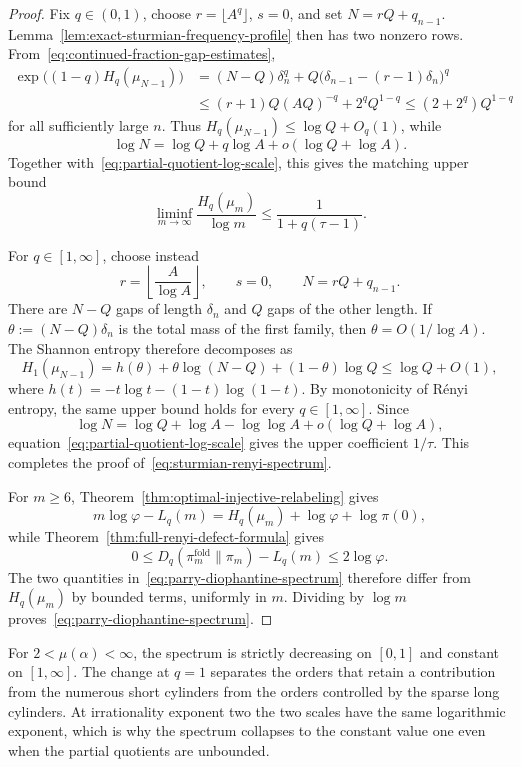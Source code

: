 \begin{proof}
Fix \(q\in(0,1)\), choose \(r=\lfloor A^q\rfloor\), \(s=0\), and set
\(N=rQ+q_{n-1}\). Lemma~\ref{lem:exact-sturmian-frequency-profile} then
has two nonzero rows. From~\eqref{eq:continued-fraction-gap-estimates},
\[
\begin{aligned}
\exp\bigl((1-q)H_q(\mu_{N-1})\bigr)
&=(N-Q)\delta_n^q
+Q\bigl(\delta_{n-1}-(r-1)\delta_n\bigr)^q\\
&\le (r+1)Q(AQ)^{-q}+2^q Q^{1-q}
\le (2+2^q)Q^{1-q}
\end{aligned}
\]
for all sufficiently large \(n\). Thus
\(H_q(\mu_{N-1})\le\log Q+O_q(1)\), while
\[
\log N=\log Q+q\log A+o(\log Q+\log A).
\]
Together with~\eqref{eq:partial-quotient-log-scale}, this gives the matching
upper bound
\[
\liminf_{m\to\infty}\frac{H_q(\mu_m)}{\log m}
\le\frac{1}{1+q(\tau-1)}.
\]

For \(q\in[1,\infty]\), choose instead
\[
r=\left\lfloor\frac{A}{\log A}\right\rfloor,\qquad
s=0,\qquad
N=rQ+q_{n-1}.
\]
There are \(N-Q\) gaps of length \(\delta_n\) and \(Q\) gaps of the other
length. If
\(\theta:=(N-Q)\delta_n\) is the total mass of the first family, then
\(\theta=O(1/\log A)\). The Shannon entropy therefore decomposes as
\[
H_1(\mu_{N-1})
=h(\theta)+\theta\log(N-Q)+(1-\theta)\log Q
\le\log Q+O(1),
\]
where \(h(t)=-t\log t-(1-t)\log(1-t)\). By monotonicity of R\'enyi entropy,
the same upper bound holds for every \(q\in[1,\infty]\). Since
\[
\log N=\log Q+\log A-\log\log A+o(\log Q+\log A),
\]
equation~\eqref{eq:partial-quotient-log-scale} gives the upper coefficient
\(1/\tau\). This completes the proof of~\eqref{eq:sturmian-renyi-spectrum}.

For \(m\ge6\), Theorem~\ref{thm:optimal-injective-relabeling} gives
\[
m\log\varphi-L_q(m)
=H_q(\mu_m)+\log\varphi+\log\pi(0),
\]
while Theorem~\ref{thm:full-renyi-defect-formula} gives
\[
0\le D_q(\pi_m^{\mathrm{fold}}\|\pi_m)-L_q(m)
\le2\log\varphi.
\]
The two quantities in~\eqref{eq:parry-diophantine-spectrum} therefore differ
from \(H_q(\mu_m)\) by bounded terms, uniformly in \(m\). Dividing by
\(\log m\) proves~\eqref{eq:parry-diophantine-spectrum}.
\end{proof}

\begin{remark}
For \(2<\mu(\alpha)<\infty\), the spectrum is strictly decreasing on
\([0,1]\) and constant on \([1,\infty]\). The change at \(q=1\) separates the
orders that retain a contribution from the numerous short cylinders from the
orders controlled by the sparse long cylinders. At irrationality exponent
two the two scales have the same logarithmic exponent, which is why the
spectrum collapses to the constant value one even when the partial quotients
are unbounded.
\end{remark}
